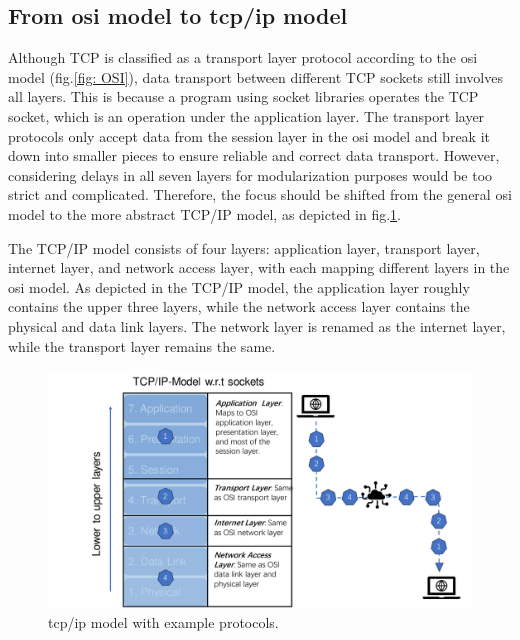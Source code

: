 \subsection{From \gls{osi} model to \gls{tcp/ip} model}

Although TCP is classified as a transport layer protocol according to the 
\gls{osi} model (fig.\ref{fig: OSI}), data transport between different TCP sockets 
still involves all layers. This is because a program using socket libraries 
operates the TCP socket, which is an operation under the application layer. 
The transport layer protocols only accept data from the session layer in the 
\gls{osi} model and break it down into smaller pieces to ensure reliable and correct 
data transport. However, considering delays in all seven layers for modularization 
purposes would be too strict and complicated. Therefore, the focus should be 
shifted from the general \gls{osi} model to the more abstract TCP/IP model, as depicted 
in fig.\ref{fig: TCP_IP}.

The TCP/IP model consists of four layers: application layer, transport layer, 
internet layer, and network access layer, with each mapping different layers in 
the \gls{osi} model. As depicted in the TCP/IP model, the application layer roughly 
contains the upper three layers, while the network access layer contains the 
physical and data link layers. The network layer is renamed as the internet 
layer, while the transport layer remains the same.

\begin{figure}[htb]
    \centering
    \includegraphics[width=\textwidth]{figures/TCP_IP.pdf}
    \caption{\gls{tcp/ip} model with example protocols. \label{fig: TCP_IP}}
\end{figure}

